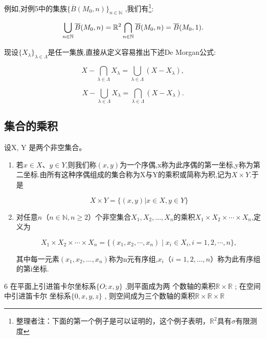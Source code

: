 例如,对例5中的集族\(\{\overline{B}(M_0, n)\}_{n\in\mathbb{N}}\) ,我们有\footnote[1]{整理者注：下面的第一个例子是可以证明的，这个例子表明，$\mathbb{R}^2$具有$\sigma$有限测度}:

\[
\bigcup_{n\in\mathbb{N}}\overline{B}(M_0,n)=\mathbb{R}^2 \\
\bigcap_{n\in\mathbb{N}}\overline{B}(M_0,n)=\overline{B}(M_0,1).\]


现设\(\{X_\lambda\}_{\lambda\in\Lambda}\)是任一集族,直接从定义容易推出下述De Morgan公式:

\[X-\bigcap_{\lambda\in\Lambda}X_\lambda
=\bigcup_{\lambda\in\Lambda}(X-X_\lambda),\]

\[X-\bigcup_{\lambda\in\Lambda}X_\lambda
=\bigcap_{\lambda\in\Lambda}(X-X_\lambda).\]

\subsection*{集合的乘积}

\begin{mydef*}{}

设X, Y 是两个非空集合。

\begin{enumerate}[label=\arabic{enumi})]
	\item 若\(x\in X\)、\(y\in Y\),则我们称\((x,y)\)为一个序偶,x称为此序偶的第一坐标,y称为第二坐标.由所有这种序偶组成的集合称为X与Y的乘积或简称为积,记为\(X\times Y\).于是
	
	\[X \times Y = \{(x, y) | x \in X, y \in Y\}\]
	
	\item 对任意\(n\)（\(n\in\mathbb{N},n\geq2\)）个非空集合\(X_1,X_2,\dots,X_n\)的乘积\(X_1\times X_2\times\cdots\times X_n\),定义为
	
	\[X_1 \times X_2 \times \cdots \times X_n = \{(x_1, x_2, \cdots, x_n) \mid x_i \in X_i, i = 1, 2, \cdots, n\},\]
	
	其中每一元素\((x_1,x_2,\dots,x_n)\)称为n元有序组,\(x_i\)（\(i=1,2,\dots,n\)）称为此有序组的第i坐标.
	
\end{enumerate}

\end{mydef*}

\begin{sourceexample}{6}
	在平面上引进笛卡尔坐标系\(\{O; x, y\}\) ,则平面成为两 个数轴的乘积\(\mathbb{R} \times \mathbb{R}\) ; 在空间中引进笛卡尔 坐标系\(\{0, x, y, z\}\) , 则空间成为三个数轴的乘积$\mathbb{R}\times\mathbb{R}\times\mathbb{R}$
\end{sourceexample}

